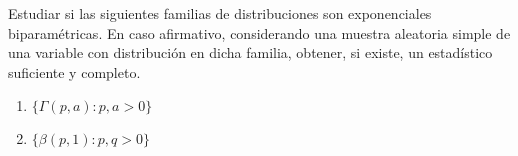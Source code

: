 \begin{ejercicio}
    Estudiar si las siguientes familias de distribuciones son exponenciales biparamétricas.  En caso afirmativo, considerando una muestra aleatoria simple de una variable con distribución en dicha familia, obtener, si existe, un estadístico suficiente y completo.
    \begin{enumerate}[label=\alph*)]
        \item $\{\Gamma(p,a) : p,a>0\}$
        \item $\{\beta(p,1) : p,q>0\}$
    \end{enumerate}
\end{ejercicio}
